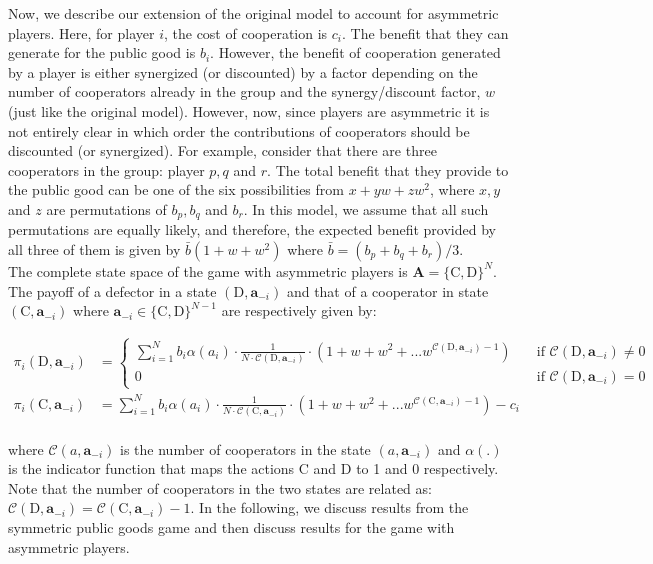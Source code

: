 \documentclass[11pt]{article}
\theoremstyle{plainCl1}
\theoremstyle{plainCl2}
\newcommand{\A}{\mathbf{A}}
\newcommand{\abf}{\mathbf{a}}
\newcommand{\C}{\mathrm{C}}
\newcommand{\D}{\mathrm{D}}
\begin{document}
\noindent Now, we describe our extension of the original model to account for asymmetric players. Here, for player $i$, the cost of cooperation is $c_i$. The benefit that they can generate for the public good is $b_i$. However, the benefit of cooperation generated by a player is either synergized (or discounted) by a factor depending on the number of cooperators already in the group and the synergy/discount factor, $w$ (just like the original model). However, now, since players are asymmetric it is not entirely clear in which order the contributions of cooperators should be discounted (or synergized). For example, consider that there are three cooperators in the group: player $p, q$ and $r$. The total benefit that they provide to the public good can be one of the six possibilities from $x + y w + z w^2$, where $x,y$ and $z$ are permutations  of $b_p, b_q$ and $b_r$. In this model, we assume that all such permutations are equally likely, and therefore, the expected benefit provided by all three of them is given by $\bar{b}(1 + w + w^2)$ where $\bar{b} = (b_p + b_q + b_r)/3$. \\ 

\noindent The complete state space of the game with asymmetric players is $\A = \{\C,\D\}^N$. The payoff of a defector in a state $(\D, \abf_{-i})$ and that of a cooperator in state $(\C,\abf_{-i})$ where $\abf_{-i} \in \{\C,\D\}^{N-1}$ are respectively given by:

\begin{align}
\pi_i(\D, \abf_{-i})&= 
\begin{cases}
\displaystyle \sum_{i=1}^N b_i \alpha(a_i) \cdot \frac{1}{N \cdot \mathcal{C}(\D,\abf_{-i})} \cdot \left(1 + w + w^2 + ...w^{\mathcal{C}(\D,\abf_{-i}) - 1} \right) &\quad  \text{if } \mathcal{C}(\D,\abf_{-i}) \neq 0 \\[15pt]
0 &\quad  \text{if } \mathcal{C}(\D,\abf_{-i}) = 0
\end{cases} \\[15pt]
\pi_i(\C, \abf_{-i}) &= \displaystyle \sum_{i=1}^N b_i \alpha(a_i) \cdot \frac{1}{N \cdot \mathcal{C}(\C,\abf_{-i})} \cdot \left(1 + w + w^2 + ...w^{\mathcal{C}(\C,\abf_{-i}) - 1} \right) - c_i
\label{Eq:payoff-synergistic-asymmetric}
\end{align} \\
\noindent where $\mathcal{C}(a,\abf_{-i})$ is the number of cooperators in the state $(a,\abf_{-i})$ and $\alpha(.)$ is the indicator function that maps the actions $\C$ and $\D$ to 1 and 0 respectively. Note that the number of cooperators in the two states are related as: $\mathcal{C}(\D,\abf_{-i}) = \mathcal{C}(\C,\abf_{-i}) - 1$. In the following, we discuss results from the symmetric public goods game and then discuss results for the game with asymmetric players.\\
\end{document}
